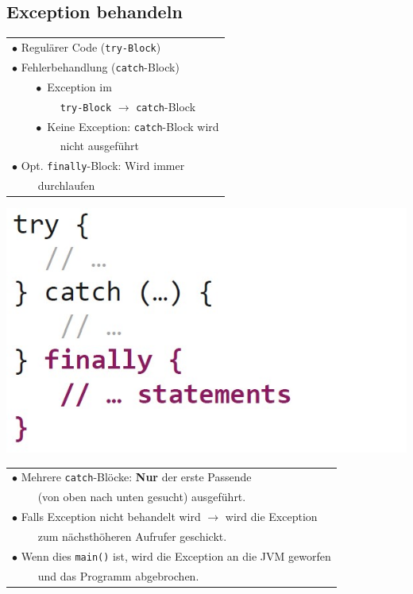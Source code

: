 {\subsection{Exception behandeln}
    \begin{minipage}{0.7\columnwidth}
        \begin{tabular}{l}
            $\bullet$ Regulärer Code (\verb|try-Block|)\\
            $\bullet$ Fehlerbehandlung (\verb|catch|-Block)\\
                $\qquad\bullet$ Exception im\\
                $\qquad\qquad$ \verb|try-Block| $\rightarrow$ \verb|catch|-Block\\
                $\qquad\bullet$ Keine Exception: \verb|catch|-Block wird\\
                $\qquad\qquad$ nicht ausgeführt\\
            $\bullet$ Opt. \verb|finally|-Block: Wird immer\\
                $\qquad$ durchlaufen\\
        \end{tabular}
    \end{minipage}
    \hfill
    \begin{minipage}{0.35\columnwidth}
        \includegraphics[width=\linewidth]{pictures/try-catch-finally.jpg}
    \end{minipage}

    \begin{tabular}{l}
        \hline
        $\bullet$ Mehrere \verb|catch|-Blöcke: \textbf{Nur} der erste Passende\\
        $\qquad$ (von oben nach unten gesucht) ausgeführt.\\\hline
        $\bullet$ Falls Exception nicht behandelt wird $\rightarrow$ wird die Exception\\
        $\qquad$ zum nächsthöheren Aufrufer geschickt.\\
        $\bullet$ Wenn dies \verb|main()| ist, wird die Exception an die JVM geworfen\\
        $\qquad$ und das Programm abgebrochen.\\  
    \end{tabular}
    \vspace{-0.3cm}

}
